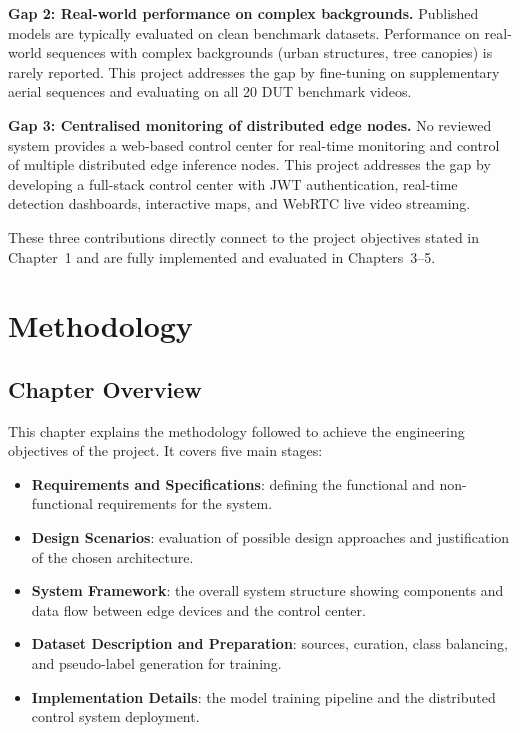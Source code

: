 \documentclass[12pt,a4paper]{report}
\begin{document}
\textbf{Gap 2: Real-world performance on complex backgrounds.}
Published models are typically evaluated on clean benchmark datasets.
Performance on real-world sequences with complex backgrounds (urban
structures, tree canopies) is rarely reported. This project addresses
the gap by fine-tuning on supplementary aerial sequences and evaluating
on all 20 DUT benchmark videos.

\textbf{Gap 3: Centralised monitoring of distributed edge nodes.}
No reviewed system provides a web-based control center for real-time
monitoring and control of multiple distributed edge inference nodes.
This project addresses the gap by developing a full-stack control center
with JWT authentication, real-time detection dashboards, interactive maps,
and WebRTC live video streaming.

These three contributions directly connect to the project objectives stated
in Chapter~1 and are fully implemented and evaluated in Chapters~3--5.

\chapter{Methodology}

\section{Chapter Overview}

This chapter explains the methodology followed to achieve the engineering
objectives of the project. It covers five main stages:

\begin{itemize}
  \item \textbf{Requirements and Specifications}: defining the functional
        and non-functional requirements for the system.
  \item \textbf{Design Scenarios}: evaluation of possible design
        approaches and justification of the chosen architecture.
  \item \textbf{System Framework}: the overall system structure showing
        components and data flow between edge devices and the control center.
  \item \textbf{Dataset Description and Preparation}: sources, curation,
        class balancing, and pseudo-label generation for training.
  \item \textbf{Implementation Details}: the model training pipeline
        and the distributed control system deployment.
\end{itemize}
\end{document}
